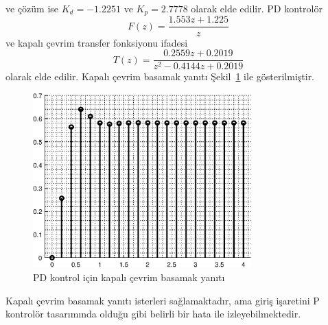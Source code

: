 ve çözüm ise $K_d=-1.2251$ ve $K_p=2.7778$ olarak elde edilir. PD kontrolör
\begin{equation}
    F(z)=\frac{1.553 z + 1.225}{z}
\end{equation}
ve kapalı çevrim transfer fonksiyonu ifadesi
\begin{equation}
    T(z)=\frac{0.2559 z + 0.2019}{z^2 - 0.4144 z + 0.2019}
\end{equation}
olarak elde edilir. Kapalı çevrim basamak yanıtı Şekil~\ref{fig:lec8_step1} ile gösterilmiştir.
\begin{figure}[!htb]
    \centering
    \includegraphics[width=0.75\textwidth]{img/lec8_step1}
    \caption{PD kontrol için kapalı çevrim basamak yanıtı}
    \label{fig:lec8_step1}
\end{figure}
Kapalı çevrim basamak yanıtı isterleri sağlamaktadır, ama giriş işaretini P kontrolör tasarımında olduğu gibi belirli bir hata ile izleyebilmektedir.